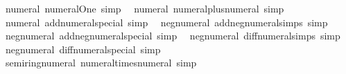 \begin{isabellebody}
%
\isadelimproof
\isanewline
%
\endisadelimproof
\isanewline
{}\isamarkupfalse%
%
\isadelimdocument
%
\endisadelimdocument
%
\isatagdocument
%
\isamarkuptrue%
%
\endisatagdocument
{\isafolddocument}%
%
\isadelimdocument
%
\endisadelimdocument
{}\isamarkupfalse%
\ {\isacharparenleft}{\kern0pt}\ numeral{\isacharparenright}{\kern0pt}\ numeral{\isacharunderscore}{\kern0pt}One\ {\isacharbrackleft}{\kern0pt}simp{\isacharbrackright}{\kern0pt}\isanewline
{}\isamarkupfalse%
\ {\isacharparenleft}{\kern0pt}\ numeral{\isacharparenright}{\kern0pt}\ numeral{\isacharunderscore}{\kern0pt}plus{\isacharunderscore}{\kern0pt}numeral\ {\isacharbrackleft}{\kern0pt}simp{\isacharbrackright}{\kern0pt}\isanewline
{}\isamarkupfalse%
\ {\isacharparenleft}{\kern0pt}\ numeral{\isacharparenright}{\kern0pt}\ add{\isacharunderscore}{\kern0pt}numeral{\isacharunderscore}{\kern0pt}special\ {\isacharbrackleft}{\kern0pt}simp{\isacharbrackright}{\kern0pt}\isanewline
{}\isamarkupfalse%
\ {\isacharparenleft}{\kern0pt}\ neg{\isacharunderscore}{\kern0pt}numeral{\isacharparenright}{\kern0pt}\ add{\isacharunderscore}{\kern0pt}neg{\isacharunderscore}{\kern0pt}numeral{\isacharunderscore}{\kern0pt}simps\ {\isacharbrackleft}{\kern0pt}simp{\isacharbrackright}{\kern0pt}\isanewline
{}\isamarkupfalse%
\ {\isacharparenleft}{\kern0pt}\ neg{\isacharunderscore}{\kern0pt}numeral{\isacharparenright}{\kern0pt}\ add{\isacharunderscore}{\kern0pt}neg{\isacharunderscore}{\kern0pt}numeral{\isacharunderscore}{\kern0pt}special\ {\isacharbrackleft}{\kern0pt}simp{\isacharbrackright}{\kern0pt}\isanewline
{}\isamarkupfalse%
\ {\isacharparenleft}{\kern0pt}\ neg{\isacharunderscore}{\kern0pt}numeral{\isacharparenright}{\kern0pt}\ diff{\isacharunderscore}{\kern0pt}numeral{\isacharunderscore}{\kern0pt}simps\ {\isacharbrackleft}{\kern0pt}simp{\isacharbrackright}{\kern0pt}\isanewline
{}\isamarkupfalse%
\ {\isacharparenleft}{\kern0pt}\ neg{\isacharunderscore}{\kern0pt}numeral{\isacharparenright}{\kern0pt}\ diff{\isacharunderscore}{\kern0pt}numeral{\isacharunderscore}{\kern0pt}special\ {\isacharbrackleft}{\kern0pt}simp{\isacharbrackright}{\kern0pt}\isanewline
{}\isamarkupfalse%
\ {\isacharparenleft}{\kern0pt}\ semiring{\isacharunderscore}{\kern0pt}numeral{\isacharparenright}{\kern0pt}\ numeral{\isacharunderscore}{\kern0pt}times{\isacharunderscore}{\kern0pt}numeral\ {\isacharbrackleft}{\kern0pt}simp{\isacharbrackright}{\kern0pt}\isanewline

\end{isabellebody}
